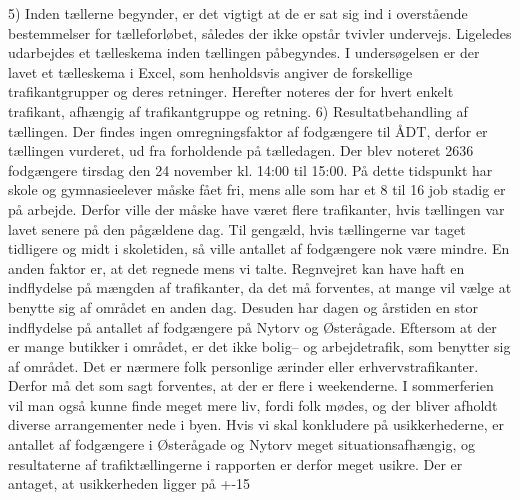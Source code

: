 5) Inden tællerne begynder, er det vigtigt at de er sat sig ind i overstående bestemmelser for tælleforløbet, således der ikke opstår tvivler undervejs. Ligeledes udarbejdes et tælleskema inden tællingen påbegyndes. I undersøgelsen er der lavet et tælleskema i Excel, som henholdsvis angiver de forskellige trafikantgrupper og deres retninger. Herefter noteres der for hvert enkelt trafikant, afhængig af trafikantgruppe og retning.
6) Resultatbehandling af tællingen.
Der findes ingen omregningsfaktor af fodgængere til ÅDT, derfor er tællingen vurderet, ud fra forholdende på tælledagen. Der blev noteret 2636 fodgængere tirsdag den 24 november kl. 14:00 til 15:00. På dette tidspunkt har skole og gymnasieelever måske fået fri, mens alle som har et 8 til 16 job stadig er på arbejde. Derfor ville der måske have været flere trafikanter, hvis tællingen var lavet senere på den pågældene dag. Til gengæld, hvis tællingerne var taget tidligere og midt i skoletiden, så ville antallet af fodgængere nok være mindre. En anden faktor er, at det regnede mens vi talte. Regnvejret kan have haft en indflydelse på mængden af trafikanter, da det må forventes, at mange vil vælge at benytte sig af området en anden dag. Desuden har dagen og årstiden en stor indflydelse på antallet af fodgængere på Nytorv og Østerågade. Eftersom at der er mange butikker i området, er det ikke bolig– og arbejdetrafik, som benytter sig af området. Det er nærmere folk personlige ærinder eller erhvervstrafikanter. Derfor må det som sagt forventes, at der er flere i weekenderne. I sommerferien vil man også kunne finde meget mere liv, fordi folk mødes, og der bliver afholdt diverse arrangementer nede i byen. Hvis vi skal konkludere på usikkerhederne, er antallet af fodgængere i Østerågade og Nytorv meget situationsafhængig, og resultaterne af trafiktællingerne i rapporten er derfor meget usikre. Der er antaget, at usikkerheden ligger på +-15%
